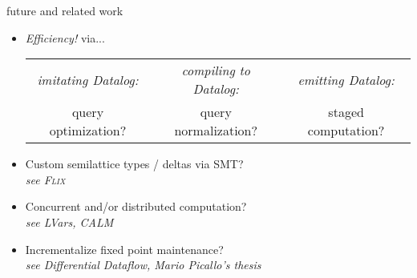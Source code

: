 \documentclass[aspectratio=169,dvipsnames]{beamer}
\newcommand\standout{\color{standout}}
\newcommand\ensuretext[1]{\ifmmode\text{#1}\else{#1}\fi}
\newcommand\todocolor{\color{OrangeRed}}
\newcommand\todo[1]{{\todocolor\ensuretext{\bfseries\sffamily[{#1}]}}}
\begin{document}

  \begin{frame}{future and related work}
    \centering

    \begin{itemize}
      \setlength\itemsep{2ex}
    \item \emph{Efficiency!} via... %

      \begin{center}
        \large
        \begin{tabular}{ccc}
          \emph{\normalsize imitating Datalog:}
          &
          \emph{\normalsize compiling to Datalog:}
          &
          \emph{\normalsize emitting Datalog:}
          \\
          query optimization?
          & query normalization?
          & staged computation?
        \end{tabular}
      \end{center}

    \item Custom semilattice types / deltas via SMT?
      \\
      {\large\itshape see {\upshape\scshape Flix}}

    \item Concurrent and/or distributed computation?
      \\
      {\large\itshape see LVars, CALM}

      \item Incrementalize fixed point maintenance?
        \\
        {\large\itshape see Differential Dataflow, Mario Picallo's thesis}
    \end{itemize}

  \end{frame}
\end{document}
